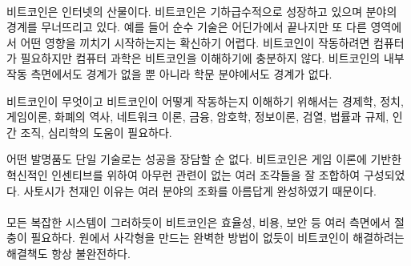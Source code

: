 \paragraph{} 
\begin{comment}Bitcoin is a child of the internet. It is growing exponentially,
blurring the lines between disciplines. It isn’t clear, for example, where the
realm of pure technology ends and where another realm begins. Even though
Bitcoin requires computers to function efficiently, computer science is not
sufficient to understand it. Bitcoin is not only borderless in regards to its
inner workings but also boundaryless in respect to academic disciplines.
\end{comment}
비트코인은 인터넷의 산물이다. 
비트코인은 기하급수적으로 성장하고 있으며 분야의 경계를 무너뜨리고 있다.
예를 들어 순수 기술은 어딘가에서 끝나지만 또 다른 영역에서 어떤 영향을 끼치기 시작하는지는 확신하기 어렵다.
비트코인이 작동하려면 컴퓨터가 필요하지만 컴퓨터 과학은 비트코인을 이해하기에 충분하지 않다.
비트코인의 내부 작동 측면에서도 경계가 없을 뿐 아니라 학문 분야에서도 경계가 없다.

\begin{comment}
Economics, politics, game theory, monetary history, network theory, finance,
cryptography, information theory, censorship, law and regulation, human
organization, psychology -- all these and more are areas of expertise which might
help in the quest of understanding how Bitcoin works and what Bitcoin is.
\end{comment}
비트코인이 무엇이고 비트코인이 어떻게 작동하는지 이해하기 위해서는 
경제학, 정치, 게임이론, 화폐의 역사, 네트워크 이론, 금융, 암호학, 정보이론, 검열, 법률과 규제,
인간 조직, 심리학의 도움이 필요하다.


\begin{comment}
No single invention is responsible for its success. It is the combination of
multiple, previously unrelated pieces, glued together by game theoretical
incentives, which make up the revolution that is Bitcoin. The beautiful blend of
many disciplines is what makes Satoshi a genius.
\end{comment}
어떤 발명품도 단일 기술로는 성공을 장담할 순 없다. 
비트코인은 게임 이론에 기반한 혁신적인 인센티브를 위하여
아무런 관련이 없는 여러 조각들을 잘 조합하여 구성되었다.
사토시가 천재인 이유는 여러 분야의 조화를 아름답게 완성하였기 때문이다.


\paragraph{} 
\begin{comment}Like every complex system, Bitcoin has to make tradeoffs in terms
of efficiency, cost, security, and many other properties. Just like there is no
perfect solution to deriving a square from a circle, any solution to the
problems which Bitcoin tries to solve will always be imperfect as well.
\end{comment}
모든 복잡한 시스템이 그러하듯이 비트코인은 효율성, 비용, 보안 등 여러 측면에서 절충이 필요하다.
원에서 사각형을 만드는 완벽한 방법이 없듯이 
비트코인이 해결하려는 해결책도 항상 불완전하다.

